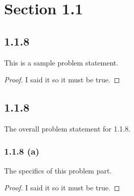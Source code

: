 \documentclass{article}
\begin{document}
\section*{Section 1.1}
\subsection*{1.1.8}
This is a sample problem statement.
\begin{proof}
  I said it so it must be true.
\end{proof}

\subsection*{1.1.8}
The overall problem statement for 1.1.8.

\subsubsection*{1.1.8 (a)}
The specifics of this problem part.
\begin{proof}
  I said it so it must be true.
\end{proof}
\end{document}
